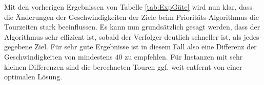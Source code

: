 \documentclass[german,version-2019-11]{uzl-thesis}
\begin{document}
\begin{table}[htpb]
\centering
{}
\caption{Ziele mit gleichen Geschwindigkeiten im Prioritäts-Algorithmus}
\label{tab:ExpPrio}
\end{table}\noindent

Mit den vorherigen Ergebnissen von Tabelle \ref{tab:ExpGüte} wird nun klar, dass die Änderungen der Geschwindigkeiten der Ziele beim Prioritäts-Algorithmus die Tourzeiten stark beeinflussen. Es kann nun grundsätzlich gesagt werden, dass der Algorithmus sehr effizient ist, sobald der Verfolger deutlich schneller ist, als jedes gegebene Ziel. Für sehr gute Ergebnisse ist in diesem Fall also eine Differenz der Geschwindigkeiten von mindestens $40$ zu empfehlen. Für Instanzen mit sehr kleinen Differenzen sind die berechneten Touren ggf. weit entfernt von einer optimalen Lösung. 

\end{document}
